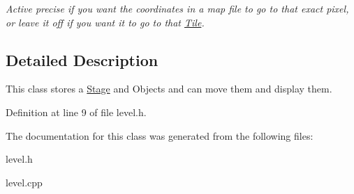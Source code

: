 \begin{DoxyCompactItemize}
\begin{DoxyCompactList}\small\item\em Active precise if you want the coordinates in a map file to go to that exact pixel, or leave it off if you want it to go to that \hyperlink{classTile}{Tile}. \end{DoxyCompactList}\end{DoxyCompactItemize}


\subsection{Detailed Description}
This class stores a \hyperlink{classStage}{Stage} and Objects and can move them and display them. 

Definition at line 9 of file level.\+h.



The documentation for this class was generated from the following files\+:\begin{DoxyCompactItemize}
\item 
level.\+h\item 
level.\+cpp\end{DoxyCompactItemize}
